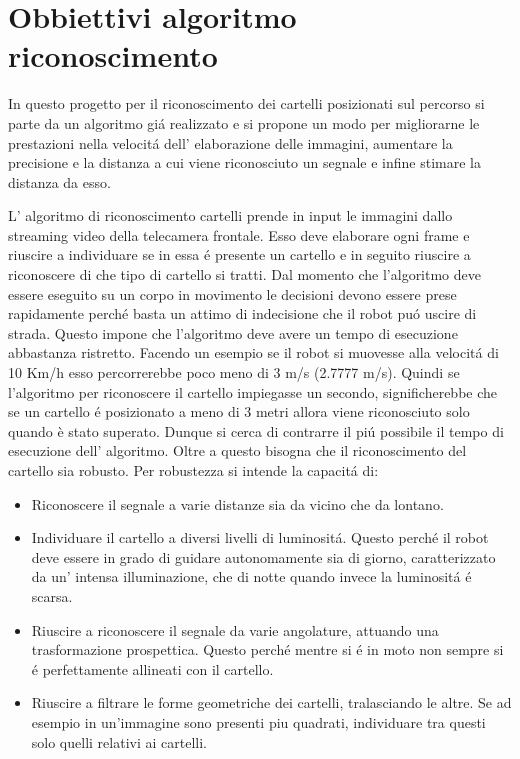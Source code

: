 \section{Obbiettivi algoritmo riconoscimento}

	In questo progetto per il riconoscimento dei cartelli posizionati sul percorso si parte da un algoritmo gi\'a realizzato e si propone un modo per migliorarne le prestazioni nella velocit\'a dell' elaborazione delle immagini, aumentare la precisione e la distanza a cui viene riconosciuto un segnale e infine stimare la distanza da esso.
	
	L' algoritmo di riconoscimento cartelli prende in input le immagini dallo streaming video della telecamera frontale. Esso deve elaborare ogni frame e riuscire a individuare se in essa \'e presente un cartello e in seguito riuscire a riconoscere di che tipo di cartello si tratti. Dal momento che l'algoritmo deve essere eseguito su un corpo in movimento le decisioni devono essere prese rapidamente perch\'e basta un attimo di indecisione che il robot pu\'o uscire di strada. Questo impone che l'algoritmo deve avere un tempo di esecuzione abbastanza ristretto. Facendo un esempio se il robot si muovesse alla velocit\'a di 10 Km/h esso percorrerebbe poco meno di 3 m/s (2.7777 m/s). Quindi se l'algoritmo per riconoscere il cartello impiegasse un secondo, significherebbe che se un cartello \'e posizionato a meno di 3 metri allora viene riconosciuto solo quando è stato superato. Dunque si cerca di contrarre il pi\'u possibile il tempo di esecuzione dell' algoritmo. Oltre a questo bisogna che il riconoscimento del cartello sia robusto. Per robustezza si intende la capacit\'a di:
		\begin{itemize}
		\item Riconoscere il segnale a varie distanze sia da vicino che da lontano.
		\item Individuare il cartello a diversi livelli di luminosit\'a. Questo perch\'e il robot deve essere in grado di guidare autonomamente sia di giorno, caratterizzato da un' intensa illuminazione, che di notte quando invece la luminosit\'a \'e scarsa.
		\item Riuscire a riconoscere il segnale da varie angolature, attuando una trasformazione prospettica. Questo perch\'e mentre si \'e in moto non sempre si \'e perfettamente allineati con il cartello. 
		\item Riuscire a filtrare le forme geometriche dei cartelli, tralasciando le altre. Se ad esempio in un'immagine sono presenti piu quadrati, individuare tra questi solo quelli relativi ai cartelli.
	\end{itemize}

